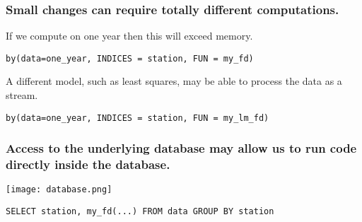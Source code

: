 \documentclass{beamer}
\begin{document}
\begin{frame}[fragile]

    \frametitle{Small changes can require totally different
    computations.}


    If we compute on one year then this will exceed memory.

\begin{verbatim}
by(data=one_year, INDICES = station, FUN = my_fd)
\end{verbatim}

\pause 

    A different model, such as least squares, may be able to process the
    data as a stream.

\begin{verbatim}
by(data=one_year, INDICES = station, FUN = my_lm_fd)
\end{verbatim}

\end{frame}
\begin{frame}[fragile]


    \frametitle{Access to the underlying database may allow us to run code directly inside the
    database.}

    \centerline{\texttt{[image: database.png]}}

\begin{verbatim}
SELECT station, my_fd(...) FROM data GROUP BY station
\end{verbatim}

\end{frame}
\end{document}
